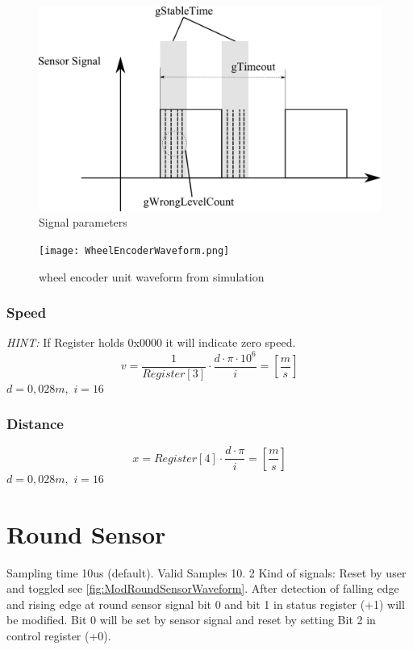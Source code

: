 \documentclass {scrartcl}
\begin{document}
\begin{figure}[h]
	\centering
		\includegraphics[width=1.00\textwidth]{./WheelEncoderTimer_Signal_Parameters.png}
	\caption{Signal parameters}
	\label{fig:WheelEncoderTimer_Signal_Parameters}
\end{figure}

\begin{figure}[h]
	\centering
		\texttt{[image: WheelEncoderWaveform.png]}
	\caption{wheel encoder unit waveform from simulation}
	\label{fig:WheelEncoderWaveform}
\end{figure}

\subsubsection{Speed}
\emph{HINT:} If Register holds 0x0000 it will indicate zero speed.
$$ v = \frac{1}{Register[3]} \cdot  \frac{d \cdot \pi \cdot 10^{6}}{i}  = [\frac{m}{s}] $$
$ d=0,028 m,$
$ i=16 $

\subsubsection{Distance}
$$ x = {Register[4]} \cdot  \frac{d \cdot \pi}{i}  = [\frac{m}{s}] $$
$ d=0,028 m,$
$ i=16 $


\section{Round Sensor}
Sampling time 10us (default). Valid Samples 10.
2 Kind of signals: Reset by user and toggled see \ref{fig:ModRoundSensorWaveform}.
After detection of falling edge and rising edge at round sensor signal bit 0 and bit 1 in status register (+1) will be modified. Bit 0 will be set by sensor signal and reset by setting Bit 2 in control register (+0).
\end{document}
